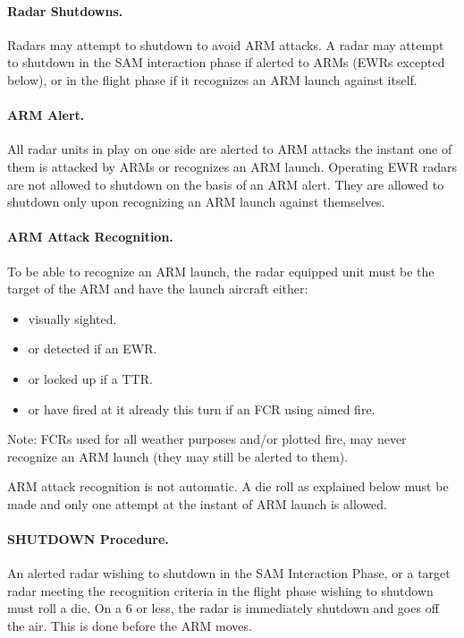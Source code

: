 \paragraph{Radar Shutdowns.} Radars may attempt to shutdown to avoid ARM attacks. A radar may attempt to shutdown in the SAM interaction phase if alerted to ARMs (EWRs excepted below), or in the flight phase if it recognizes an ARM launch against itself.

\paragraph{ARM Alert.} All radar units in play on one side are alerted to ARM attacks the instant one of them is attacked by ARMs or recognizes an ARM launch. Operating EWR radars are not allowed to shutdown on the basis of an ARM alert. They are allowed to shutdown only upon recognizing an ARM launch against themselves.

\paragraph{ARM Attack Recognition.} To be able to recognize an ARM launch, the radar equipped unit must be the target of the ARM and have the launch aircraft either:

\begin{itemize}
    \item visually sighted.

    \item or detected if an EWR.

    \item or locked up if a TTR.

    \item or have fired at it already this turn if an FCR using aimed fire.
\end{itemize}

Note: FCRs used for all weather purposes and/or plotted fire, may never recognize an ARM launch (they may still be alerted to them).

ARM attack recognition is not automatic. A die roll as explained below must be made and only one attempt at the instant of ARM launch is allowed.

\paragraph{SHUTDOWN Procedure.} An alerted radar wishing to shutdown in the SAM Interaction Phase, or a target radar meeting the recognition criteria in the flight phase wishing to shutdown must roll a die. On a 6 or less, the radar is immediately shutdown and goes off the air. This is done before the ARM moves.


